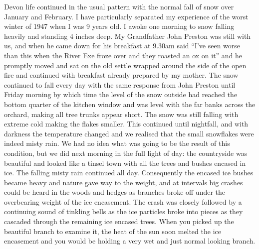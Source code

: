 
Devon life continued in the usual pattern with the normal fall of snow over
January and February. I have particularly separated my experience of the worst
winter of 1947 when I was 9 years old. I awoke one morning to snow falling
heavily and standing 4 inches deep. My Grandfather John Preston was still with
us, and when he came down for his breakfast at 9.30am said ``I've seen worse
than this when the River Exe froze over and they roasted an ox on it'' and he
promptly moved and sat on the old settle wrapped around the side of the open
fire and continued with breakfast already prepared by my mother. The snow
continued to fall every day with the same response from John Preston until
Friday morning by which time the level of the snow outside had reached the
bottom quarter of the kitchen window and was level with the far banks across
the orchard, making all tree trunks appear short. The snow was still falling
with extreme cold making the flakes smaller. This continued until nightfall,
and with darkness the temperature changed and we realised that the small
snowflakes were indeed misty rain. We had no idea what was going to be the
result of this condition, but we did next morning in the full light of day: the
countryside was beautiful and looked like a tinsel town with all the trees and
bushes encased in ice. The falling misty rain continued all day. Consequently
the encased ice bushes became heavy and nature gave way to the weight, and at
intervals big crashes could be heard in the woods and hedges as branches broke
off under the overbearing weight of the ice encasement. The crash was closely
followed by a continuing sound of tinkling bells as the ice particles broke
into pieces as they cascaded through the remaining ice encased trees. When you
picked up the beautiful branch to examine it, the heat of the sun soon melted
the ice encasement and you would be holding a very wet and just normal looking
branch.

